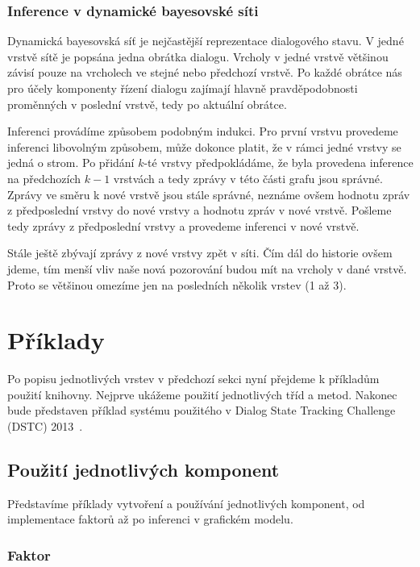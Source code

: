 \subsubsection{Inference v dynamické bayesovské síti}

Dynamická bayesovská síť je nejčastější reprezentace dialogového stavu.
V jedné vrstvě sítě je popsána jedna obrátka dialogu.
Vrcholy v jedné vrstvě většinou závisí pouze na vrcholech ve stejné nebo předchozí vrstvě.
Po každé obrátce nás pro účely komponenty řízení dialogu zajímají hlavně pravděpodobnosti proměnných v poslední vrstvě, tedy po aktuální obrátce.

Inferenci provádíme způsobem podobným indukci.
Pro první vrstvu provedeme inferenci libovolným způsobem, může dokonce platit, že v rámci jedné vrstvy se jedná o strom.
Po přidání $k$-té vrstvy předpokládáme, že byla provedena inference na předchozích $k-1$ vrstvách a tedy zprávy v této části grafu jsou správné.
Zprávy ve směru k nové vrstvě jsou stále správné, neznáme ovšem hodnotu zpráv z předposlední vrstvy do nové vrstvy a hodnotu zpráv v nové vrstvě.
Pošleme tedy zprávy z předposlední vrstvy a provedeme inferenci v nové vrstvě.

Stále ještě zbývají zprávy z nové vrstvy zpět v síti.
Čím dál do historie ovšem jdeme, tím menší vliv naše nová pozorování budou mít na vrcholy v dané vrstvě.
Proto se většinou omezíme jen na posledních několik vrstev (1 až 3).

\section{Příklady}

Po popisu jednotlivých vrstev v předchozí sekci nyní přejdeme k příkladům použití knihovny.
Nejprve ukážeme použití jednotlivých tříd a metod.
Nakonec bude představen příklad systému použitého v Dialog State Tracking Challenge (DSTC) 2013~\cite{dstc2013}.

\subsection{Použití jednotlivých komponent}
\label{sec:usage}

Představíme příklady vytvoření a používání jednotlivých komponent, od implementace faktorů až po inferenci v grafickém modelu.

\subsubsection{Faktor}

